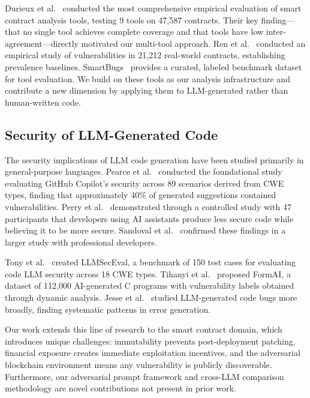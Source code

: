 Durieux et al.~\cite{durieux2020empirical} conducted the most comprehensive empirical evaluation of smart contract analysis tools, testing 9 tools on 47,587 contracts. Their key finding---that no single tool achieves complete coverage and that tools have low inter-agreement---directly motivated our multi-tool approach. Ren et al.~\cite{ren2021empirical} conducted an empirical study of vulnerabilities in 21,212 real-world contracts, establishing prevalence baselines. SmartBugs~\cite{smartbugs} provides a curated, labeled benchmark dataset for tool evaluation. We build on these tools as our analysis infrastructure and contribute a new dimension by applying them to LLM-generated rather than human-written code.

\subsection{Security of LLM-Generated Code}

The security implications of LLM code generation have been studied primarily in general-purpose languages. Pearce et al.~\cite{copilot_eval} conducted the foundational study evaluating GitHub Copilot's security across 89 scenarios derived from CWE types, finding that approximately 40\% of generated suggestions contained vulnerabilities. Perry et al.~\cite{perry2023users} demonstrated through a controlled study with 47 participants that developers using AI assistants produce less secure code while believing it to be more secure. Sandoval et al.~\cite{sandoval2023lost} confirmed these findings in a larger study with professional developers.

Tony et al.~\cite{tony2023llmSecEval} created LLMSecEval, a benchmark of 150 test cases for evaluating code LLM security across 18 CWE types. Tihanyi et al.~\cite{tihanyi2023formai} proposed FormAI, a dataset of 112,000 AI-generated C programs with vulnerability labels obtained through dynamic analysis. Jesse et al.~\cite{jesse2023large} studied LLM-generated code bugs more broadly, finding systematic patterns in error generation.

Our work extends this line of research to the smart contract domain, which introduces unique challenges: immutability prevents post-deployment patching, financial exposure creates immediate exploitation incentives, and the adversarial blockchain environment means any vulnerability is publicly discoverable. Furthermore, our adversarial prompt framework and cross-LLM comparison methodology are novel contributions not present in prior work.

